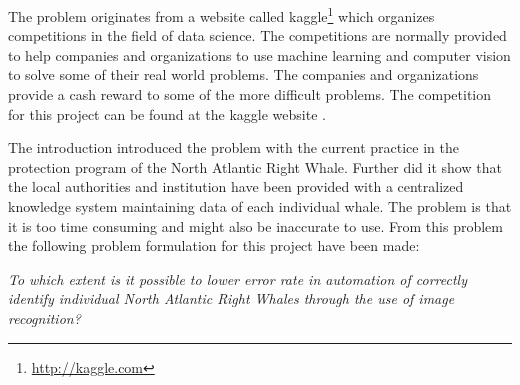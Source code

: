 The problem originates from a website called kaggle\footnote{\url{http://kaggle.com}} which organizes competitions in the field of data science. The competitions are normally provided to help companies and organizations to use machine learning and computer vision to solve some of their real world problems. The companies and organizations provide a cash reward to some of the more difficult problems. The competition for this project can be found at the kaggle website \cite{kaggle:competition}.

The introduction introduced the problem with the current practice in the protection program of the North Atlantic Right Whale. Further did it show that the local authorities and institution have been provided with a centralized knowledge system maintaining data of each individual whale.
The problem is that it is too time consuming and might also be inaccurate to use.
From this problem the following problem formulation for this project have been made:

\begin{center}
	\emph{To which extent is it possible to lower error rate in automation of correctly identify individual North Atlantic Right Whales through the use of image recognition?}
\end{center}
